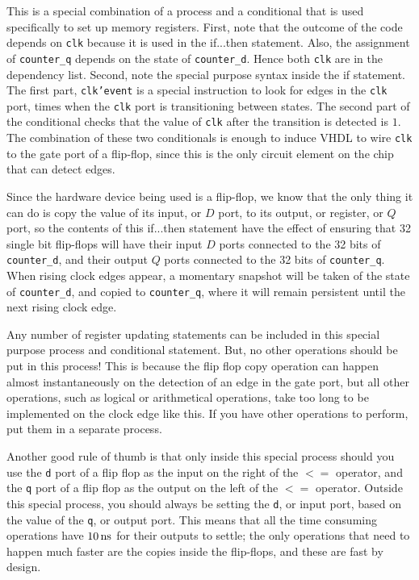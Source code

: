 \documentclass[../physical_computing.tex]{subfiles}
\begin{document}
This is a special combination of a process and a conditional that is used specifically to set up memory registers. First, note that the outcome of the code depends on \texttt{clk} because it is used in the if...then statement. Also, the assignment of \texttt{counter\_q} depends on the state of \texttt{counter\_d}. Hence both \texttt{clk} are in the dependency list. Second, note the special purpose syntax inside the if statement. The first part, \texttt{clk'event} is a special instruction to look for edges in the \texttt{clk} port, times when the \texttt{clk} port is transitioning between states. The second part of the conditional checks that the value of \texttt{clk} after the transition is detected is $1$. The combination of these two conditionals is enough to induce VHDL to wire \texttt{clk} to the gate port of a flip-flop, since this is the only circuit element on the chip that can detect edges.

Since the hardware device being used is a flip-flop, we know that the only thing it can do is copy the value of its input, or $D$ port, to its output, or register, or $Q$ port, so the contents of this if...then statement have the effect of ensuring that 32 single bit flip-flops will have their input $D$ ports connected to the 32 bits of \texttt{counter\_d}, and their output $Q$ ports connected to the 32 bits of \texttt{counter\_q}. When rising clock edges appear, a momentary snapshot will be taken of the state of \texttt{counter\_d}, and copied to \texttt{counter\_q}, where it will remain persistent until the next rising clock edge.

Any number of register updating statements can be included in this special purpose process and conditional statement. But, no other operations should be put in this process! This is because the flip flop copy operation can happen almost instantaneously on the detection of an edge in the gate port, but all other operations, such as logical or arithmetical operations, take too long to be implemented on the clock edge like this. If you have other operations to perform, put them in a separate process.

Another good rule of thumb is that only inside this special process should you use the \texttt{d} port of a flip flop as the input on the right of the $<=$ operator, and the \texttt{q} port of a flip flop as the output on the left of the $<=$ operator. Outside this special process, you should always be setting the \texttt{d}, or input port, based on the value of the \texttt{q}, or output port. This means that all the time consuming operations have $\rm 10\,ns$ for their outputs to settle; the only operations that need to happen much faster are the copies inside the flip-flops, and these are fast by design.
\end{document}
